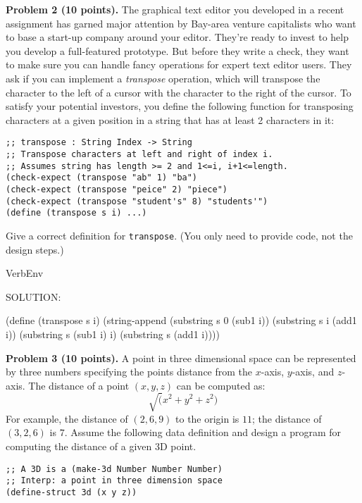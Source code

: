 \documentclass[12pt]{article}
\begin{document}
\newpage

\noindent
{\bf Problem 2 (10 points).}
%
The graphical text editor you developed in a recent assignment has
garned major attention by Bay-area venture capitalists who want to
base a start-up company around your editor.  They're ready to invest
to help you develop a full-featured prototype.  But before they write
a check, they want to make sure you can handle fancy operations for
expert text editor users.  They ask if you can implement a
\emph{transpose} operation, which will transpose the character to the
left of a cursor with the character to the right of the cursor.  To
satisfy your potential investors, you define the following function
for transposing characters at a given position in a string that has at
least 2 characters in it:
\begin{verbatim}
;; transpose : String Index -> String
;; Transpose characters at left and right of index i.
;; Assumes string has length >= 2 and 1<=i, i+1<=length.
(check-expect (transpose "ab" 1) "ba")
(check-expect (transpose "peice" 2) "piece")
(check-expect (transpose "student's" 8) "students'")
(define (transpose s i) ...)
\end{verbatim}

\noindent
Give a correct definition for \verb|transpose|.  (You only need to
provide code, not the design steps.)

\begin{SaveVerbatim}{VerbEnv}

SOLUTION:
  
(define (transpose s i)
  (string-append (substring s 0 (sub1 i))
                 (substring s i (add1 i))
                 (substring s (sub1 i) i)
                 (substring s (add1 i))))
\end{SaveVerbatim}




\newpage 
\noindent
{\bf Problem 3 (10 points).}
%
A point in three dimensional space can be represented by three numbers
specifying the points distance from the $x$-axis, $y$-axis, and
$z$-axis.  The distance of a point $(x,y,z)$ can be computed as:
\[\sqrt(x^2+y^2+z^2)\]
For example, the distance of $(2,6,9)$ to the origin is $11$; the
distance of $(3,2,6)$ is $7$.  Assume the following data definition
and design a program for computing the distance of a given 3D
point.

\begin{verbatim}
;; A 3D is a (make-3d Number Number Number)
;; Interp: a point in three dimension space
(define-struct 3d (x y z))
\end{verbatim}
\end{document}
